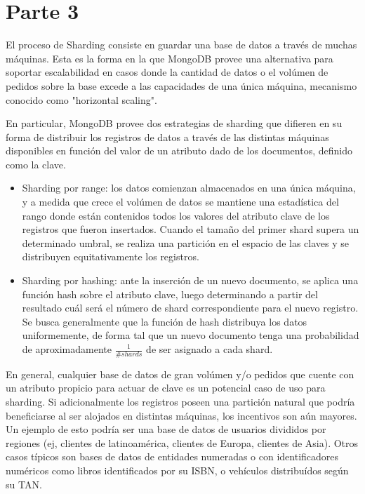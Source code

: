 \section{Parte 3}

El proceso de Sharding consiste en guardar una base de datos a través de muchas máquinas. Esta es la forma en la que MongoDB provee una alternativa para soportar escalabilidad en casos donde la cantidad de datos o el volúmen de pedidos sobre la base excede a las capacidades de una única máquina, mecanismo conocido como "horizontal scaling".

En particular, MongoDB provee dos estrategias de sharding que difieren en su forma de distribuir los registros de datos a través de las distintas máquinas disponibles en función del valor de un atributo dado de los documentos, definido como la clave.

\begin{itemize}
  \item Sharding por range: los datos comienzan almacenados en una única máquina, y a medida que crece el volúmen de datos se mantiene una estadística del rango donde están contenidos todos los valores del atributo clave de los registros que fueron insertados. Cuando el tamaño del primer shard supera un determinado umbral, se realiza una partición en el espacio de las claves y se distribuyen equitativamente los registros.
  \item Sharding por hashing: ante la inserción de un nuevo documento, se aplica una función hash sobre el atributo clave, luego determinando a partir del resultado cuál será el número de shard correspondiente para el nuevo registro. Se busca generalmente que la función de hash distribuya los datos uniformemente, de forma tal que un nuevo documento tenga una probabilidad de aproximadamente $\frac{1}{\#shards}$ de ser asignado a cada shard.
\end{itemize}

En general, cualquier base de datos de gran volúmen y/o pedidos que cuente con un atributo propicio para actuar de clave es un potencial caso de uso para sharding. Si adicionalmente los registros poseen una partición natural que podría beneficiarse al ser alojados en distintas máquinas, los incentivos son aún mayores. Un ejemplo de esto podría ser una base de datos de usuarios divididos por regiones (ej, clientes de latinoamérica, clientes de Europa, clientes de Asia). Otros casos típicos son bases de datos de entidades numeradas o con identificadores numéricos como libros identificados por su ISBN, o vehículos distribuídos según su TAN.

